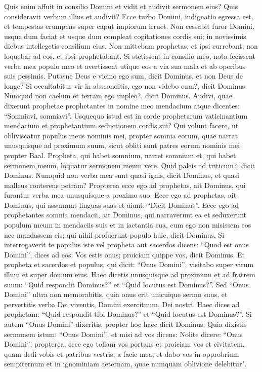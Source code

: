 \begin{biblechapter}
\verse Quis enim affuit in consilio Domini et vidit et audivit sermonem eius? Quis consideravit verbum illius et audivit? 
\verse Ecce turbo Domini, indignatio egressa est, et tempestas erumpens super caput impiorum irruet. 
\verse Non cessabit furor Domini, usque dum faciat et usque dum compleat cogitationes cordis sui; in novissimis diebus intellegetis consilium eius. 
\verse Non mittebam prophetas, et ipsi currebant; non loquebar ad eos, et ipsi prophetabant. 
\verse Si stetissent in consilio meo, nota fecissent verba mea populo meo et avertissent utique eos a via sua mala et ab operibus suis pessimis. 
\verse Putasne Deus e vicino ego sum, dicit Dominus, et non Deus de longe? 
\verse Si occultabitur vir in absconditis, ego non videbo eum?, dicit Dominus. Numquid non caelum et terram ego impleo?, dicit Dominus. 
\verse Audivi, quae dixerunt prophetae prophetantes in nomine meo mendacium atque dicentes: “Somniavi, somniavi”. 
\verse Usquequo istud est in corde prophetarum vaticinantium mendacium et prophetantium seductionem cordis sui? 
\verse Qui volunt facere, ut obliviscatur populus meus nominis mei, propter somnia eorum, quae narrat unusquisque ad proximum suum, sicut obliti sunt patres eorum nominis mei propter Baal. 
\verse Propheta, qui habet somnium, narret somnium et, qui habet sermonem meum, loquatur sermonem meum vere. Quid paleis ad triticum?, dicit Dominus. 
\verse Numquid non verba mea sunt quasi ignis, dicit Dominus, et quasi malleus conterens petram? 
\verse Propterea ecce ego ad prophetas, ait Dominus, qui furantur verba mea unusquisque a proximo suo. 
\verse Ecce ego ad prophetas, ait Dominus, qui assumunt linguas suas et aiunt: “Dicit Dominus”. 
\verse Ecce ego ad prophetantes somnia mendacii, ait Dominus, qui narraverunt ea et seduxerunt populum meum in mendaciis suis et in iactantia sua, cum ego non misissem eos nec mandassem eis; qui nihil profuerunt populo huic, dicit Dominus. 
\verse Si interrogaverit te populus iste vel propheta aut sacerdos dicens: “Quod est onus Domini”, dices ad eos: Vos estis onus; proiciam quippe vos, dicit Dominus.  
\verse Et propheta et sacerdos et populus, qui dicit: “Onus Domini”, visitabo super virum illum et super domum eius. 
\verse Haec dicetis unusquisque ad proximum et ad fratrem suum: “Quid respondit Dominus?” et “Quid locutus est Dominus?”.  
\verse Sed “Onus Domini” ultra non memorabitis, quia onus erit unicuique sermo suus, et pervertitis verba Dei viventis, Domini exercituum, Dei nostri. 
\verse Haec dices ad prophetam: “Quid respondit tibi Dominus?” et “Quid locutus est Dominus?”. 
\verse Si autem “Onus Domini” dixeritis, propter hoc haec dicit Dominus: Quia dixistis sermonem istum: “Onus Domini”, et misi ad vos dicens: Nolite dicere: “Onus Domini”; 
\verse propterea, ecce ego tollam vos portans et proiciam vos et civitatem, quam dedi vobis et patribus vestris, a facie mea;  
\verse et dabo vos in opprobrium sempiternum et in ignominiam aeternam, quae numquam oblivione delebitur". 
\end{biblechapter}


